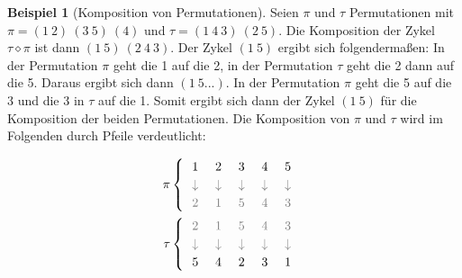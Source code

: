 \documentclass[12pt,a4paper, usenames, dvipsnames]{article}
\theoremstyle{mystyle}
\newtheorem{definition}{Definition}
\theoremstyle{definition}
\newtheorem{bsp}{Beispiel}[definition]
\begin{document}
\begin{bsp}[Komposition von Permutationen]
Seien $\pi$ und $\tau$ Permutationen mit $\pi = (1 \ 2) \ (3 \ 5) \ (4)$ und $\tau = (1 \ 4\ 3) \ (2 \ 5)$. Die Komposition der Zykel $\tau \diamond \pi$ ist dann $(1 \ 5) \ (2 \ 4 \ 3)$. 
Der Zykel $(1 \ 5)$ ergibt sich folgendermaßen: In der Permutation $\pi$ geht die 1 auf die 2, in der Permutation $\tau$ geht die 2 dann auf die 5. Daraus ergibt sich dann $(1 \ 5 ...)$. In der Permutation $\pi$ geht die 5 auf die 3 und die 3 in $\tau$ auf die 1. Somit ergibt sich dann der Zykel $(1 \ 5)$ für die Komposition der beiden Permutationen. Die Komposition von $\pi$ und $\tau$ wird im Folgenden durch Pfeile verdeutlicht:

\begin{align*}
\pi \begin{cases}
\ \  1 \ \ \ \  2 \ \ \ \  3 \ \ \ \  4 \ \ \ \  5 \\
\ \  \textcolor{gray}{\downarrow \ \ \ \ \downarrow \ \ \ \  \downarrow \ \ \ \ \downarrow \ \ \ \  \downarrow} \\
\ \  \textcolor{gray}{2 \ \ \ \  1 \ \ \ \  5 \ \ \ \  4 \ \ \ \  3}
\end{cases}
\\
\tau \begin{cases}
\ \  \textcolor{gray}{ 2 \ \ \ \  1 \ \ \ \  5 \ \ \ \  4 \ \ \ \  3} \\
\ \ \textcolor{gray}{\downarrow \ \ \ \ \downarrow \ \ \ \  \downarrow \ \ \ \ \downarrow \ \ \ \  \downarrow} \\
\ \ 5 \ \ \ \  4 \ \ \ \  2 \ \ \ \  3 \ \ \ \  1
\end{cases}
\end{align*}
 
\end{bsp}
%
%
%
%
%
%
%
%
%
%
%
%
%


\end{document}
